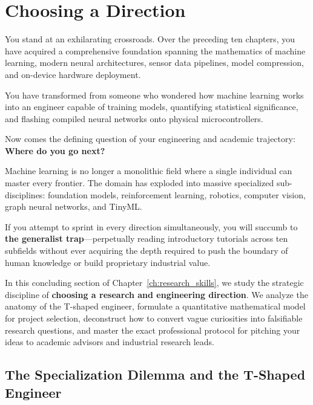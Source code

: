 \section{Choosing a Direction}\label{sec:choosing_direction}

You stand at an exhilarating crossroads. Over the preceding ten chapters, you have acquired a comprehensive foundation spanning the mathematics of machine learning, modern neural architectures, sensor data pipelines, model compression, and on-device hardware deployment. 

You have transformed from someone who wondered how machine learning works into an engineer capable of training models, quantifying statistical significance, and flashing compiled neural networks onto physical microcontrollers.

Now comes the defining question of your engineering and academic trajectory: \textbf{Where do you go next?}

Machine learning is no longer a monolithic field where a single individual can master every frontier. The domain has exploded into massive specialized sub-disciplines: foundation models, reinforcement learning, robotics, computer vision, graph neural networks, and TinyML. 

If you attempt to sprint in every direction simultaneously, you will succumb to \textbf{the generalist trap}---perpetually reading introductory tutorials across ten subfields without ever acquiring the depth required to push the boundary of human knowledge or build proprietary industrial value.

In this concluding section of Chapter~\ref{ch:research_skills}, we study the strategic discipline of \textbf{choosing a research and engineering direction}. We analyze the anatomy of the T-shaped engineer, formulate a quantitative mathematical model for project selection, deconstruct how to convert vague curiosities into falsifiable research questions, and master the exact professional protocol for pitching your ideas to academic advisors and industrial research leads.

\subsection{The Specialization Dilemma and the T-Shaped Engineer}\label{subsec:t_shaped_engineer}

